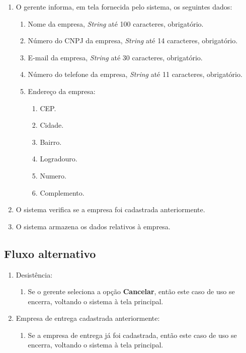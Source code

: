 \begin{enumerate}
	\item O gerente informa, em tela fornecida pelo sistema, os seguintes dados:
	\begin{enumerate}
		\item Nome da empresa, \emph{String} até 100 caracteres, obrigatório.
		\item Número do CNPJ da empresa, \emph{String} até 14 caracteres, obrigatório.
		\item E-mail da empresa, \emph{String} até 30 caracteres, obrigatório.
		\item Número do telefone da empresa, \emph{String} até 11 caracteres, obrigatório.
		\item Endereço da empresa:
		\begin{enumerate}
			\item CEP.
			\item Cidade.
			\item Bairro.
			\item Logradouro.
			\item Numero.
			\item Complemento.
		\end{enumerate}	
	\end{enumerate}
	\item O sistema verifica se a empresa foi cadastrada anteriormente.
	\item O sistema armazena os dados relativos à empresa.
\end{enumerate}

\subsection{Fluxo alternativo}

\begin{enumerate}
	\item Desistência:
	\begin{enumerate}
		\item Se o gerente seleciona a opção \textbf{Cancelar}, então este caso de uso se encerra, voltando o sistema à tela principal.
	\end{enumerate}
	\item Empresa de entrega cadastrada anteriormente:
	\begin{enumerate}
		\item Se a empresa de entrega já foi cadastrada, então este caso de uso se encerra, voltando o
		sistema à tela principal.
	\end{enumerate}
\end{enumerate}

